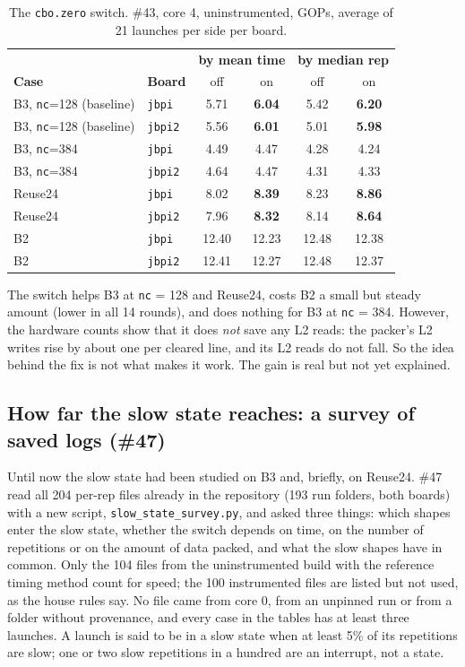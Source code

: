 \documentclass[11pt,a4paper]{article}
\newcommand{\good}[1]{\textcolor{green!45!black}{\textbf{#1}}}
\newcommand{\slow}[1]{\textcolor{red!70!black}{#1}}
\begin{document}
\begin{table}[h]
\centering\small
\begin{tabular}{@{}llcccc@{}}
\toprule
& & \multicolumn{2}{c}{\textbf{by mean time}} & \multicolumn{2}{c}{\textbf{by median rep}} \\
\textbf{Case} & \textbf{Board} & off & on & off & on \\
\midrule
B3, \texttt{nc}=128 (baseline) & \texttt{jbpi}  & 5.71 & \good{6.04} & 5.42 & \good{6.20} \\
B3, \texttt{nc}=128 (baseline) & \texttt{jbpi2} & 5.56 & \good{6.01} & 5.01 & \good{5.98} \\
B3, \texttt{nc}=384 & \texttt{jbpi}  & 4.49 & 4.47 & 4.28 & 4.24 \\
B3, \texttt{nc}=384 & \texttt{jbpi2} & 4.64 & 4.47 & 4.31 & 4.33 \\
Reuse24 & \texttt{jbpi}  & 8.02 & \good{8.39} & 8.23 & \good{8.86} \\
Reuse24 & \texttt{jbpi2} & 7.96 & \good{8.32} & 8.14 & \good{8.64} \\
B2 & \texttt{jbpi}  & 12.40 & \slow{12.23} & 12.48 & 12.38 \\
B2 & \texttt{jbpi2} & 12.41 & \slow{12.27} & 12.48 & 12.37 \\
\bottomrule
\end{tabular}
\caption{The \texttt{cbo.zero} switch. \#43, core 4, uninstrumented, GOPs, average of 21 launches per side per
board.}
\label{tab:cbo}
\end{table}

The switch helps B3 at \texttt{nc} = 128 and Reuse24, costs B2 a small but steady amount (lower in all 14
rounds), and does nothing for B3 at \texttt{nc} = 384. However, the hardware counts show that it does
\emph{not} save any L2 reads: the packer's L2 writes rise by about one per cleared line, and its L2 reads do not
fall. So the idea behind the fix is not what makes it work. The gain is real but not yet explained.

\subsection{How far the slow state reaches: a survey of saved logs (\#47)}
\label{sec:survey47}
Until now the slow state had been studied on B3 and, briefly, on Reuse24. \#47 read all 204 per-rep files
already in the repository (193 run folders, both boards) with a new script, \texttt{slow\_state\_survey.py}, and
asked three things: which shapes enter the slow state, whether the switch depends on time, on the number of
repetitions or on the amount of data packed, and what the slow shapes have in common. Only the 104 files from the
uninstrumented build with the reference timing method count for speed; the 100 instrumented files are listed but not
used, as the house rules say. No file came from core 0, from an unpinned run or from a folder without provenance, and
every case in the tables has at least three launches. A launch is said to be in a slow state when at least 5\% of its
repetitions are slow; one or two slow repetitions in a hundred are an interrupt, not a state.
\end{document}

